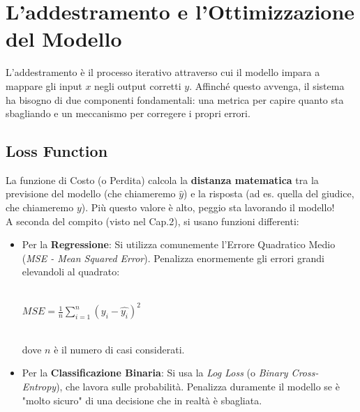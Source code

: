 \documentclass{article}
\begin{document}
\section{L'addestramento e l'Ottimizzazione del Modello}
L'addestramento è il processo iterativo attraverso cui il modello impara a mappare gli input $x$ negli output corretti $y$. Affinché questo avvenga, il sistema ha bisogno di due componenti fondamentali: una metrica per capire quanto sta sbagliando e un meccanismo per corregere i propri errori.

\subsection{Loss Function}
La funzione di Costo (o Perdita) calcola la \textbf{distanza matematica} tra la previsione del modello (che chiameremo $\hat{y}$) e la risposta (ad es. quella del giudice, che chiameremo $y$). Più questo valore è alto, peggio sta lavorando il modello!\\
A seconda del compito (visto nel Cap.2), si usano funzioni differenti:
\begin{itemize}
    \item Per la \textbf{Regressione}: Si utilizza comunemente l'Errore Quadratico Medio (\textit{MSE - Mean Squared Error}). Penalizza enormemente gli errori grandi elevandoli al quadrato:\\
    \\
    \centerline{$MSE = \frac{1}{n} \sum_{i=1}^{n}(y_i-\hat{y_i})^2$}\\

dove $n$ è il numero di casi considerati.\\

\item Per la \textbf{Classificazione Binaria}: Si usa la \textit{Log Loss} (o \textit{Binary Cross-Entropy}), che lavora sulle probabilità. Penalizza duramente il modello se è "molto sicuro" di una decisione che in realtà è sbagliata.


\end{itemize}
\end{document}
